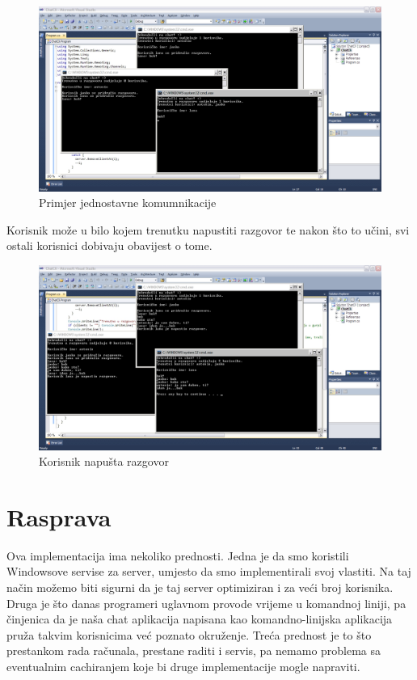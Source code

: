 \documentclass[10pt,a4paper,onecolumn,titlepage]{article}
\begin{document}
\begin{figure}[!ht]
\begin{minipage}{\textwidth}
\centering
\includegraphics[width=\textwidth]{images/comunication.jpg}
\caption{Primjer jednostavne komumnikacije}
\end{minipage}
\end{figure}

Korisnik može u bilo kojem trenutku napustiti razgovor te nakon što to učini, svi ostali korisnici dobivaju obavijest o tome.

\begin{figure}[!ht]
\begin{minipage}{\textwidth}
\centering
\includegraphics[width=\textwidth]{images/leaving_notification.jpg}
\caption{Korisnik napušta razgovor}
\end{minipage}
\end{figure}

\section{Rasprava}

Ova implementacija ima nekoliko prednosti. Jedna je da smo koristili Windowsove
servise za server, umjesto da smo implementirali svoj vlastiti. Na taj način
možemo biti sigurni da je taj server optimiziran i za veći broj korisnika.
Druga je što danas programeri uglavnom provode vrijeme u komandnoj liniji,
pa činjenica da je naša chat aplikacija napisana kao komandno-linijska aplikacija
pruža takvim korisnicima već poznato okruženje. Treća prednost je to što prestankom rada računala, prestane raditi i servis, pa nemamo problema sa eventualnim
cachiranjem koje bi druge implementacije mogle napraviti.
\end{document}

